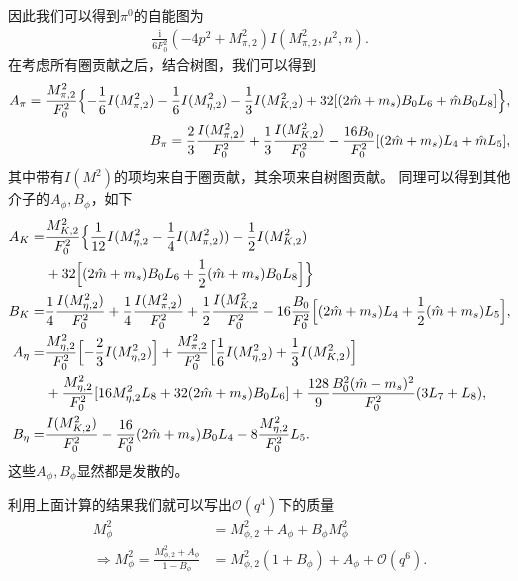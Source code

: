 \documentclass[aps,tightenlines,16pt]{ctexart}
\numberwithin{equation}{section}
\begin{document}
因此我们可以得到$\pi^0$的自能图为
\begin{align}
   \frac{\mbox{i}}{6F_0^2}(-4p^2+M_{\pi,2}^2) I(M_{\pi,2}^2,\mu^2,n).
\end{align}
在考虑所有圈贡献之后，结合树图，我们可以得到
\begin{align}
   \begin{aligned}
      A_{\pi} = \frac{M_{\pi,2}^2}{F_0^2}\Bigl\{-\frac{1}{6}I(M_{\pi,2}^2)-\frac{1}{6}I(M_{\eta,2}^2)-\frac{1}{3}I(M_{K,2}^2)+32[(2\hat{m}+m_s)B_0L_6+\hat{m}B_0L_8]\Bigr\},\\
      B_{\pi} = \frac{2}{3}\frac{I(M_{\pi,2}^2)}{F_0^2}+\frac{1}{3}\frac{I(M_{K,2}^2)}{F_0^2}-\frac{16B_0}{F_0^2}[(2\hat{m}+m_s)L_4+\hat{m}L_5],
   \end{aligned}
\end{align}
其中带有$I(M^2)$的项均来自于圈贡献，其余项来自树图贡献。
同理可以得到其他介子的$A_{\phi},B_{\phi}$，如下
\begin{align}
   \begin{aligned}
      A_K=&\frac{M_{K,2}^2}{F_0^2}\Bigl\{\frac{1}{12}I(M_{\eta,2}^2-\frac{1}{4}I(M_{\pi,2}^2))-\frac{1}{2}I(M_{K,2}^2)  \\    
      & +32\Bigl[(2\hat{m}+m_s)B_0L_6+\frac{1}{2}(\hat{m}+m_s)B_0L_8\Bigr]\Bigr\}\\
      B_K=&\frac{1}{4}\frac{I(M_{\eta,2}^2)}{F_0^2}+\frac{1}{4}\frac{I(M_{\pi,2}^2)}{F_0^2}+\frac{1}{2}\frac{I(M_{K,2}^2}{F_0^2} -16\frac{B_0}{F_0^2}\Bigl[(2\hat{m}+m_s)L_4+\frac{1}{2}(\hat{m}+m_s)L_5\Bigr],\\
      A_{\eta} = &\frac{M_{\eta,2}^2}{F_0^2}\Bigl[-\frac{2}{3}I(M_{\eta,2}^2)\Bigr]+\frac{M_{\pi,2}^2}{F_0^2}\Bigl[\frac{1}{6}I(M_{\eta,2}^2)+\frac{1}{3}I(M_{K,2}^2)\Bigr]\\
      &+\frac{M_{\eta,2}^2}{F_0^2}[16M_{\eta,2}^2L_8+32(2\hat{m}+m_s)B_0L_6]+\frac{128}{9}\frac{B_0^2(\hat{m}-m_s)^2}{F_0^2}(3L_7+L_8),\\
      B_{\eta}=&\frac{I(M_{K,2}^2)}{F_0^2}-\frac{16}{F_0^2}(2\hat{m}+m_s)B_0L_4-8\frac{M_{\eta,2}^2}{F_0^2}L_5.
      \end{aligned}
\end{align}
这些$A_{\phi},B_{\phi}$显然都是发散的。

利用上面计算的结果我们就可以写出$\mathcal{O}(q^4)$下的质量
\begin{align}
   M_{\phi}^2 &= M_{\phi,2}^2 + A_{\phi} + B_{\phi}M_{\phi}^2\\
   \Rightarrow M_{\phi}^2 = \frac{M_{\phi,2}^2+A_{\phi}}{1-B_{\phi}}&=M_{\phi,2}^2(1+B_{\phi})+A_{\phi}+\mathcal{O}(q^6).
\end{align}
\end{document}
